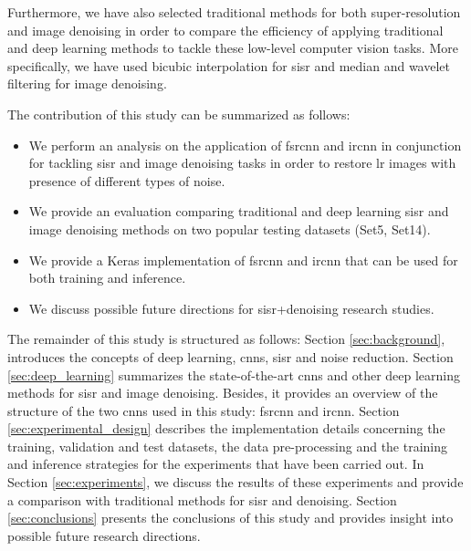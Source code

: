 Furthermore, we have also selected traditional methods for both super-resolution and image denoising in order to compare the efficiency of applying traditional and deep learning methods to tackle these low-level computer vision tasks. More specifically, we have used bicubic interpolation for \gls{sisr} and median and wavelet filtering for image denoising.

The contribution of this study can be summarized as follows:
\begin{itemize}
	\item We perform an analysis on the application of  \gls{fsrcnn} and \gls{ircnn} in conjunction for tackling \gls{sisr} and image denoising tasks in order to restore \gls{lr} images with presence of different types of noise.
	\item We provide an evaluation comparing traditional and deep learning \gls{sisr} and image denoising methods on two popular testing datasets (Set5, Set14).
	\item We provide a Keras \cite{KERAS} implementation of \gls{fsrcnn} and \gls{ircnn} that can be used for both training and inference.
	\item We discuss possible future directions for \gls{sisr}+denoising research studies.
\end{itemize}

The remainder of this study is structured as follows: Section \ref{sec:background}, introduces the concepts of deep learning, \glspl{cnn}, \gls{sisr} and noise reduction. Section \ref{sec:deep_learning} summarizes the state-of-the-art \glspl{cnn} and other deep learning methods for \gls{sisr} and image denoising. Besides, it provides an overview of the structure of the two \glspl{cnn} used in this study: \gls{fsrcnn} and \gls{ircnn}. Section \ref{sec:experimental_design} describes the implementation details concerning the training, validation and test datasets, the data pre-processing and the training and inference strategies for the experiments that have been carried out. In Section \ref{sec:experiments}, we discuss the results of these experiments and provide a comparison with traditional methods for \gls{sisr} and denoising. Section \ref{sec:conclusions} presents the conclusions of this study and provides insight into possible future research directions.